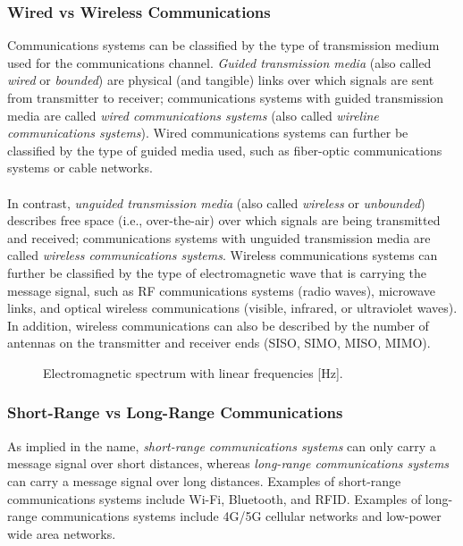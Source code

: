 \documentclass{report}
\begin{document}
\subsubsection{Wired vs Wireless Communications}
Communications systems can be classified by the type of transmission medium used for the communications channel. \emph{Guided transmission media} (also called \emph{wired} or \emph{bounded}) 
are physical (and tangible) links over which signals are sent from transmitter to receiver; communications systems with guided transmission media are called \emph{wired communications systems} (also called 
\emph{wireline communications systems}). Wired communications systems can further be classified by the type of guided media used, such as fiber-optic communications systems or cable networks. 
\\ \\
In contrast, \emph{unguided transmission media} (also called \emph{wireless} or \emph{unbounded}) describes free space (i.e., over-the-air) over which signals are being transmitted and received; 
communications systems with unguided transmission media are called \emph{wireless communications systems}. Wireless communications systems can further be classified by the type of electromagnetic wave that 
is carrying the message signal, such as RF communications systems (radio waves), microwave links, and optical wireless communications (visible, infrared, or ultraviolet waves). In addition, wireless 
communications can also be described by the number of antennas on the transmitter and receiver ends (SISO, SIMO, MISO, MIMO).

\begin{figure}
    \centering
    \caption{Electromagnetic spectrum with linear frequencies [Hz].}
    \resizebox{0.95\textwidth}{!}{%
        
    }
\end{figure}

\subsubsection{Short-Range vs Long-Range Communications}
As implied in the name, \emph{short-range communications systems} can only carry a message signal over short distances, whereas \emph{long-range communications systems} can carry a message signal over 
long distances. Examples of short-range communications systems include Wi-Fi, Bluetooth, and RFID. Examples of long-range communications systems include 4G/5G cellular networks and low-power wide area networks.
\end{document}
